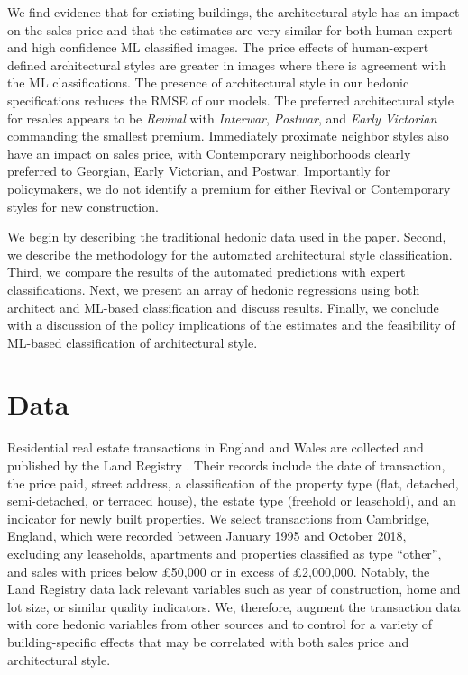 \documentclass[]{article}
\begin{document}
 We find evidence that for existing buildings, the architectural style has an impact on the sales price and that the estimates are very similar for both human expert and high confidence ML classified images. The price effects of human-expert defined architectural styles are greater in images where there is agreement with the ML classifications. The presence of architectural style in our hedonic specifications reduces the RMSE of our models. The preferred architectural style for resales appears to be \emph{Revival} with \emph{Interwar}, \emph{Postwar}, and \emph{Early Victorian} commanding the smallest premium. Immediately proximate neighbor styles also have an impact on sales price, with Contemporary neighborhoods clearly preferred to Georgian, Early Victorian, and Postwar. Importantly for policymakers, we do not identify a premium for either Revival or Contemporary styles for new construction. 
 
We begin by describing the traditional hedonic data used in the paper. Second, we describe the methodology for the automated architectural style classification. Third, we compare the results of the automated predictions with expert classifications. Next, we present an array of hedonic regressions using both architect and ML-based classification and discuss results. Finally, we conclude with a discussion of the policy implications of the estimates and the feasibility of ML-based classification of architectural style. 

\hypertarget{Data}{%
\section{Data}\label{data}
}

Residential real estate transactions in England and Wales are
collected and published by the Land Registry
\autocite{LandRegistry2016a}. Their records include the date of transaction, the price paid, street address, a classification of the
property type (flat, detached, semi-detached, or terraced house), the
estate type (freehold or leasehold), and an indicator for newly built
properties. We select transactions from Cambridge, England, which were recorded
between January 1995 and October 2018, excluding any leaseholds, apartments
and properties classified as type ``other'', and sales with prices below
£50,000 or in excess of £2,000,000. Notably, the Land Registry data lack relevant variables such as year of construction, home and lot size, or similar quality indicators. We, therefore, augment the transaction data with core hedonic variables from other sources and to control for a variety of building-specific effects that may be correlated with both sales price and architectural style.
\end{document}
